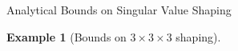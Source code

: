 \documentclass[journal]{IEEEtran}
\newtheorem{example}{Example}
\begin{document}
\begin{section}{Analytical Bounds on Singular Value Shaping}
\begin{example}[Bounds on $3 \times 3 \times 3$ shaping]
\begin{itemize}


\end{itemize}
\end{example}
\end{section}
\end{document}
